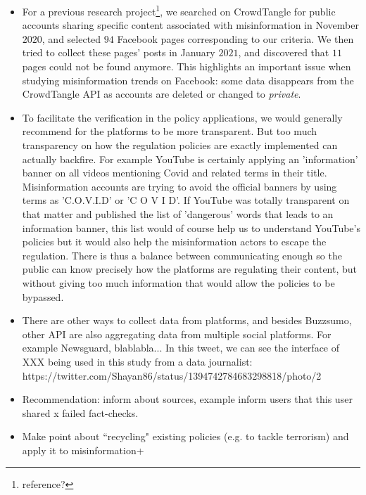 \documentclass[11pt,a4paper]{article}
\begin{document}
{ \color{pink} 
\begin{itemize}

	\item For a previous research project\footnote{reference?}, we searched on CrowdTangle for public accounts sharing specific content associated with misinformation in November $2020$, and selected $94$ Facebook pages corresponding to our criteria. We then tried to collect these pages' posts in January $2021$, and discovered that $11$ pages could not be found anymore. This highlights an important issue when studying misinformation trends on Facebook: some data disappears from the CrowdTangle API as accounts are deleted or changed to {\it private}. 



	\item To facilitate the verification in the policy applications, we would generally recommend for the platforms to be more transparent. But too much transparency on how the regulation policies are exactly implemented can actually backfire. For example YouTube is certainly applying an 'information' banner on all videos mentioning Covid and related terms in their title. Misinformation accounts are trying to avoid the official banners by using terms as 'C.O.V.I.D' or 'C O V I D'. If YouTube was totally transparent on that matter and published the list of 'dangerous' words that leads to an information banner, this list would of course help us to understand YouTube's policies but it would also help the misinformation actors to escape the regulation. There is thus a balance between communicating enough so the public can know precisely how the platforms are regulating their content, but without giving too much information that would allow the policies to be bypassed.

	\item There are other ways to collect data from platforms, and besides Buzzsumo, other API are also aggregating data from multiple social platforms. For example Newsguard, blablabla... In this tweet, we can see the interface of XXX being used in this study from a data journalist: https://twitter.com/Shayan86/status/1394742784683298818/photo/2 

	\item Recommendation: inform about sources, example inform users that this user shared x failed fact-checks. 

	\item Make point about ``recycling" existing policies (e.g. to tackle terrorism) and apply it to misinformation+


\end{itemize}}
\end{document}
